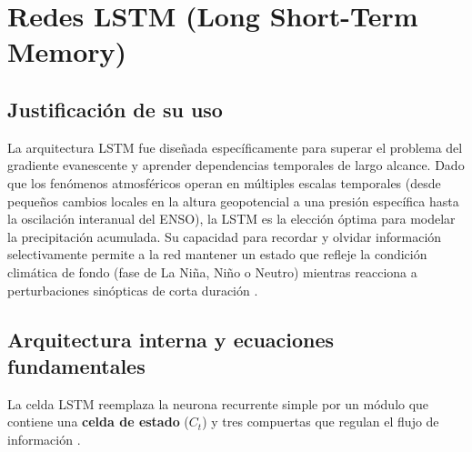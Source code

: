 \section{Redes LSTM (Long Short-Term Memory)}

\subsection{Justificación de su uso}
La arquitectura LSTM fue diseñada específicamente para superar el problema del gradiente evanescente y aprender dependencias temporales de largo alcance. Dado que los fenómenos atmosféricos operan en múltiples escalas temporales (desde pequeños cambios locales en la altura geopotencial a una presión específica hasta la oscilación interanual del ENSO), la LSTM es la elección óptima para modelar la precipitación acumulada. Su capacidad para recordar y olvidar información selectivamente permite a la red mantener un estado que refleje la condición climática de fondo (fase de La Niña, Niño o Neutro) mientras reacciona a perturbaciones sinópticas de corta duración \citep{koreanLSTM, alonso2024mathematics}.

\subsection{Arquitectura interna y ecuaciones fundamentales}
La celda LSTM reemplaza la neurona recurrente simple por un módulo que contiene una \textbf{celda de estado} (\(C_t\)) y tres compuertas que regulan el flujo de información \citep{koreanLSTM}.

